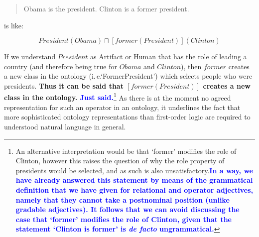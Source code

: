 \documentclass[11pt]{article}
\begin{document}
\begin{quote}
Obama is the president. Clinton is a former president.
\end{quote}

is like:

\[
President(Obama) \sqcap [former(President)](Clinton)
\]

If we understand $President$ as Artifact or Human that has the role of leading a country
(and therefore being true for $Obama$ and $Clinton$), then $former$ creates a new class in the ontology (i.\,e.`FormerPresident') which selects
people who were presidents. \textbf{Thus it
can be said that $[former(President)]$ creates a new class in the ontology. \textcolor{blue}{Just said.}}\footnote{An alternative
    interpretation would be that `former' modifies the role of Clinton, however this raises the
    question of why the role property of presidents would be selected, and as such
is also unsatisfactory.\textbf{\textcolor{blue}{In a way, we have already answered this statement by means of the grammatical definition that we have given for relational and operator adjectives, namely that they cannot take a postnominal position (unlike gradable adjectives). It follows that we can avoid discussing the case that `former' modifies the role of Clinton, given that the statement `Clinton is former' is \textit{de facto} ungrammatical.}}}
As there is at the moment no agreed representation for such an operator in an
ontology, it underlines the fact that more sophisticated ontology representations than first-order logic are required to understood natural
language in general.
\end{document}
